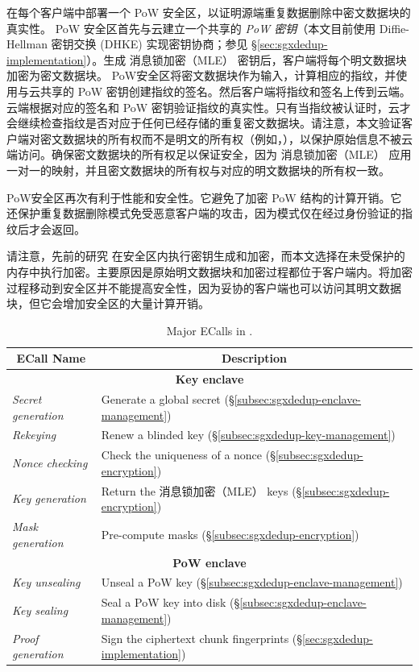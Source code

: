 \sysnameS 在每个客户端中部署一个 PoW 安全区，以证明源端重复数据删除中密文数据块的真实性。 PoW 安全区首先与云建立一个共享的 \textit{ PoW 密钥}（本文目前使用 Diffie-Hellman 密钥交换 (DHKE) 实现密钥协商；参见 \S\ref{sec:sgxdedup-implementation}）。生成 消息锁加密（MLE） 密钥后，客户端将每个明文数据块加密为密文数据块。 PoW安全区将密文数据块作为输入，计算相应的指纹，并使用与云共享的 PoW 密钥创建指纹的签名。然后客户端将指纹和签名上传到云端。云端根据对应的签名和 PoW 密钥验证指纹的真实性。只有当指纹被认证时，云才会继续检查指纹是否对应于任何已经存储的重复密文数据块。请注意，本文验证客户端对密文数据块的所有权而不是明文的所有权（例如，\cite{halevi11}），以保护原始信息不被云端访问。确保密文数据块的所有权足以保证安全，因为 消息锁加密（MLE） 应用一对一的映射，并且密文数据块的所有权与对应的明文数据块的所有权一致。

PoW安全区再次有利于性能和安全性。它避免了加密 PoW 结构的计算开销。它还保护重复数据删除模式免受恶意客户端的攻击，因为模式仅在经过身份验证的指纹后才会返回。

请注意，先前的研究 \cite{kim19,fuhry20,djoko19} 在安全区内执行密钥生成和加密，而本文选择在未受保护的内存中执行加密。主要原因是原始明文数据块和加密过程都位于客户端内。将加密过程移动到安全区并不能提高安全性，因为妥协的客户端也可以访问其明文数据块，但它会增加安全区的大量计算开销。

\begin{table}[t]
\small
\centering
\begin{tabular}{|l|l|}
\hline
\multicolumn{1}{|c|}{\bf ECall Name} & \multicolumn{1}{c|}{\bf Description}\\ 
\hline
\hline
\multicolumn{2}{|c|}{\bf Key enclave} \\
\hline
\textit{ Secret generation} & Generate a global secret 
(\S\ref{subsec:sgxdedup-enclave-management}) \\
\hline
\textit{ Rekeying} & Renew a blinded key 
(\S\ref{subsec:sgxdedup-key-management}) \\
\hline
\textit{ Nonce checking} & Check the uniqueness of a nonce 
(\S\ref{subsec:sgxdedup-encryption}) \\
\hline
\textit{ Key generation} & Return the 消息锁加密（MLE） keys (\S\ref{subsec:sgxdedup-encryption}) \\
\hline
\textit{ Mask generation} & Pre-compute masks (\S\ref{subsec:sgxdedup-encryption}) \\
\hline
\multicolumn{2}{|c|}{\bf PoW enclave} \\
\hline
  \textit{ Key unsealing} & Unseal a PoW key (\S\ref{subsec:sgxdedup-enclave-management}) \\
\hline
  \textit{ Key sealing} & Seal a PoW key into disk (\S\ref{subsec:sgxdedup-enclave-management})
\\
\hline
\textit{ Proof generation} & Sign the ciphertext chunk fingerprints 
(\S\ref{sec:sgxdedup-implementation}) \\
\hline
\end{tabular}
\vspace{-6pt}
\caption{Major ECalls in \sysnameS.}
\label{tab:sgxdedup-ecall}
\vspace{-3pt}
\end{table}


